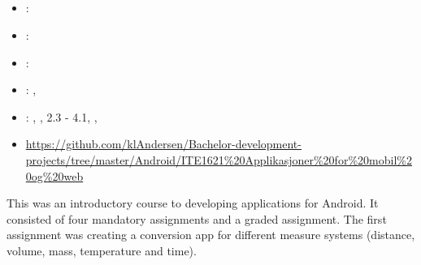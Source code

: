 \subsection[Android course]{}
\label{sec:android_course}
\begin{itemize} 
	\item {}: 
	\item {}: 
	\item {}: 
	\item {}: , 
	\item {}: , ,  2.3 - 4.1, , 
	\item {} \url{https://github.com/klAndersen/Bachelor-development-projects/tree/master/Android/ITE1621%20Applikasjoner%20for%20mobil%20og%20web}
\end{itemize} 
This was an introductory course to developing applications for Android. 
It consisted of four mandatory assignments and a graded assignment. 
\vspace{0.5em}\newline
The first assignment was creating a conversion app for different measure systems (distance, volume, mass, temperature and time).

